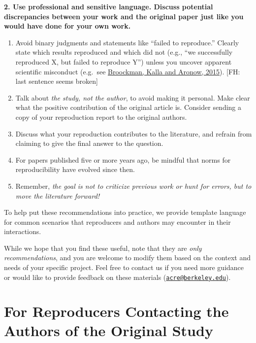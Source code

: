 \documentclass[]{book}
\providecommand{\tightlist}{%
  \setlength{\itemsep}{0pt}\setlength{\parskip}{0pt}}
\begin{document}
\textbf{2. Use professional and sensitive language. Discuss potential discrepancies between your work and the original paper just like you would have done for your own work.}

\begin{enumerate}
\def\labelenumi{\alph{enumi}.}
\tightlist
\item
  Avoid binary judgments and statements like ``failed to reproduce.'' Clearly state which results reproduced and which did not (e.g., ``we successfully reproduced X, but failed to reproduce Y'') unless you uncover apparent scientific misconduct (e.g.~see \href{https://osf.io/qy2se/}{Broockman, Kalla and Aronow, 2015}). {[}FH: last sentence seems broken{]}
\item
  Talk about \emph{the study, not the author}, to avoid making it personal. Make clear what the positive contribution of the original article is. Consider sending a copy of your reproduction report to the original authors.\\
\item
  Discuss what your reproduction contributes to the literature, and refrain from claiming to give the final answer to the question.\\
\item
  For papers published five or more years ago, be mindful that norms for reproducibility have evolved since then.\\
\item
  Remember, \emph{the goal is not to criticize previous work or hunt for errors, but to move the literature forward!}
\end{enumerate}

To help put these recommendations into practice, we provide template language for common scenarios that reproducers and authors may encounter in their interactions.

While we hope that you find these useful, note that they are \emph{only recommendations}, and you are welcome to modify them based on the context and needs of your specific project. Feel free to contact us if you need more guidance or would like to provide feedback on these materials (\href{mailto:acre@berkeley.edu}{\nolinkurl{acre@berkeley.edu}}).

\hypertarget{for-reproducers-contacting-the-authors-of-the-original-study}{%
\section{For Reproducers Contacting the Authors of the Original Study}\label{for-reproducers-contacting-the-authors-of-the-original-study}}
\end{document}
